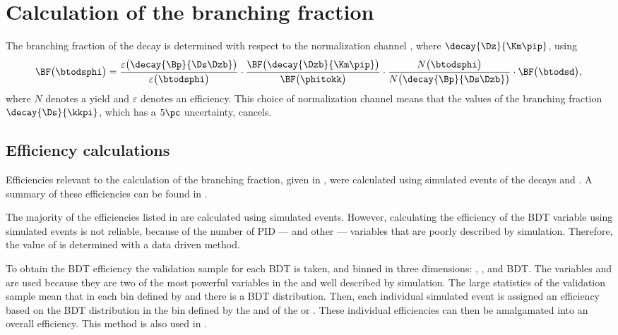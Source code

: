 \section{Calculation of the branching fraction}
\label{sec:dsphi:bf}
The branching fraction of the decay \btodsphi is determined with respect to the normalization
channel \btodsd, where $\decay{\Dz}{\Km\pip}$, using
\begin{equation}
  \BF\big(\btodsphi\big) =
  \frac{\varepsilon\big(\decay{\Bp}{\Ds\Dzb}\big)}{\varepsilon\big(\btodsphi\big)}
  \cdot
  \frac{\BF\big(\decay{\Dzb}{\Km\pip}\big)}{\BF\big(\phitokk\big)}
  \cdot
  \frac{N\big(\btodsphi\big)}{N\big(\decay{\Bp}{\Ds\Dzb}\big)}
  \cdot
  \BF\big(\btodsd\big)
  , \\
  \label{eq:dsphi:bf}
\end{equation}
where $N$ denotes a yield and $\varepsilon$ denotes an efficiency.
This choice of normalization channel means that the values of the branching fraction
$\decay{\Ds}{\kkpi}$, which has a $5\pc$ uncertainty, cancels.






\subsection{Efficiency calculations}
Efficiencies relevant to the calculation of the
branching fraction, given in , were
calculated using simulated events of the decays \btodsphi and \btodsd.
A summary of these efficiencies can be found in .

The majority of the efficiencies listed in  are calculated using simulated
\btodsphi events.
However, calculating the efficiency of the BDT variable using simulated events is not reliable,
because of the number of PID --- and other --- variables that are poorly described by simulation.
Therefore, the value of  is determined with a data driven method.

To obtain the BDT efficiency the validation sample for each BDT is taken, and binned in three
dimensions: \pt, \chisqfd, and BDT.
The variables \pt and \chisqfd are used because they are two of the most powerful variables in the
\bdt and well described by simulation.
The large statistics of the validation sample mean that in each bin defined by \pt and \chisqfd
there is a BDT distribution.
Then, each individual simulated event is assigned an efficiency based on the BDT distribution in
the bin defined by the \pt and \chisqfd of the \Ds or \phii.
These individual efficiencies can then be amalgamated into an overall efficiency.
This method is also used in .


